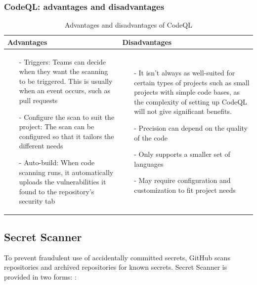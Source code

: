 \subsubsection{CodeQL: advantages and disadvantages}
\begin{table}[H]
\centering
\begin{tabular}{|>{\raggedright\arraybackslash}p{6cm}|>{\raggedright\arraybackslash}p{6cm}|}
\hline
\textbf{Advantages} & \textbf{Disadvantages} \\
\hline
\begin{itemize}
\item [-] Triggers: Teams can decide when they want the scanning to be triggered. This is usually when an event occurs, such as pull requests
\item [-]Configure the scan to suit the project: The scan can be configured so that it tailors the 
  different needs
\item [-] Auto-build: When code scanning runs, it automatically uploads the vulnerabilities it found to the repository's security tab
\end{itemize}
&
   \begin{itemize}
\item [-] It isn't always as well-suited for certain types of projects such as small projects with simple code bases, as the complexity of setting up CodeQL will not give significant benefits. 
\item [-]Precision can depend on the quality of the code
\item [-] Only supports a smaller set of languages 
\item [-] May require configuration and customization to fit project needs
\end{itemize}
\\
\hline
\end{tabular}
\caption{Advantages and disadvantages of CodeQL}
\label{tab: CodeQL}
\end{table}


\subsection{Secret Scanner}
To prevent fraudulent use of accidentally committed secrets, GitHub scans repositories and archived repositories for known secrets. Secret Scanner is provided in two forms:  \cite{GithubSecretScanning}: 

